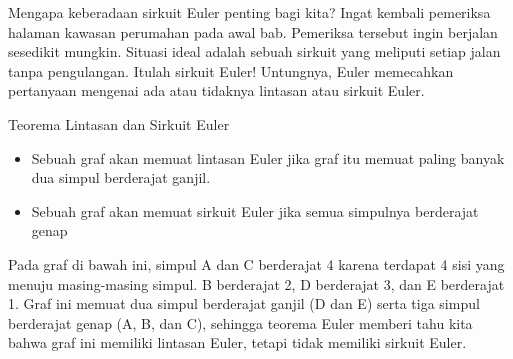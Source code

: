 Mengapa keberadaan sirkuit Euler penting bagi kita?  Ingat kembali pemeriksa halaman kawasan perumahan pada awal bab.  Pemeriksa tersebut ingin berjalan sesedikit mungkin.  Situasi ideal adalah sebuah sirkuit yang meliputi setiap jalan tanpa pengulangan.  Itulah sirkuit Euler!  Untungnya, Euler memecahkan pertanyaan mengenai ada atau tidaknya lintasan atau sirkuit Euler.

\begin{theorem}{Teorema Lintasan dan Sirkuit Euler}
\hspace{3in}
\begin{itemize}
\item Sebuah graf akan memuat lintasan Euler jika graf itu memuat paling banyak dua simpul berderajat ganjil.
\item Sebuah graf akan memuat sirkuit Euler jika semua simpulnya berderajat genap
\end{itemize}
\end{theorem}

\begin{example}{}%
Pada graf di bawah ini, simpul A dan C berderajat 4 karena terdapat 4 sisi yang menuju masing-masing simpul.  B berderajat 2, D berderajat 3, dan E berderajat 1.  Graf ini memuat dua simpul berderajat ganjil (D dan E) serta tiga simpul berderajat genap (A, B, dan C), sehingga teorema Euler memberi tahu kita bahwa graf ini memiliki lintasan Euler, tetapi tidak memiliki sirkuit Euler.\\
\end{example}

